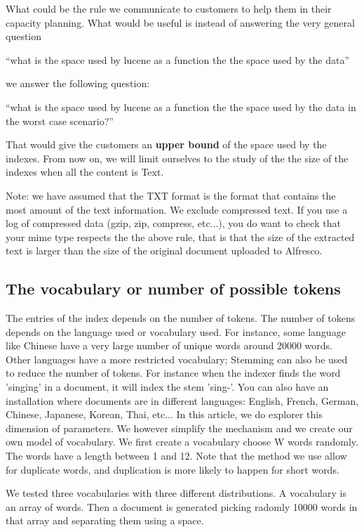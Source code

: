 \documentclass[12pt,a4]{article}
\begin{document}
What could be the rule we communicate to customers to help them in their capacity planning.
What would be useful is instead of answering the very general question

``what is the space used by lucene as a function the the space used by the data''

we answer the following question:


``what is the space used by lucene as a function the the space used by the data in the worst case scenario?''

That would give the customers an {\bf upper bound} of the space used by the indexes.
From now on, we will limit ourselves to the study of the the size of the indexes when all the content is Text.


Note: we have assumed that the TXT format is the format that contains the most amount of the text information.
We exclude compressed text. If you use a log of compressed data (gzip, zip, compress, etc...), you do want to check that your mime type respects the the above rule, that is that the size of the extracted text is larger than the size of the original document uploaded to Alfresco.

\subsection{The vocabulary or number of possible tokens}

The entries of the index depends on the number of tokens.
The number of tokens depends on the language used or vocabulary used.
For instance, some language like Chinese have a very large number of unique words around 20000 words.
Other languages have a more restricted vocabulary; Stemming can also be used to reduce the number of tokens.
For instance when the indexer finds the word 'singing' in a document, it will index the stem 'sing-'.
You can also have an installation where documents are in different languages: English, French, German, Chinese, Japanese, Korean, Thai, etc...
In this article, we do explorer this dimension of parameters. We however simplify the mechanism and we create our own model of vocabulary.
We first create a vocabulary choose W words randomly. The words have a length between 1 and 12.
Note that the method we use allow for duplicate words, and duplication is more likely to happen for short words.

We tested three vocabularies with three different distributions. A vocabulary is an array of words. Then a document is generated picking radomly 10000 words in that array and separating them using a space.
\end{document}

